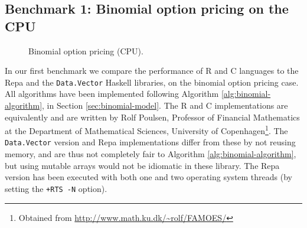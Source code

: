 \subsection{Benchmark 1: Binomial option pricing on the CPU}
\begin{figure}
	\centering
\begin{adjustbox}{minipage=1.3\textwidth,margin=0pt \smallskipamount,center}
\end{adjustbox}
\caption{Binomial option pricing (CPU).}
\label{fig:binomial-cpu}
\end{figure}

In our first benchmark we compare the performance of R and C languages
to the Repa and the \lstinline{Data.Vector} Haskell libraries, on the
binomial option pricing case. All algorithms have been implemented
following Algorithm \ref{alg:binomial-algorithm}, in Section
\ref{sec:binomial-model}. The R and C implementations are equivalently
and are written by Rolf Poulsen, Professor of Financial Mathematics at
the Department of Mathematical Sciences, University of
Copenhagen\footnote{Obtained from
  \url{http://www.math.ku.dk/~rolf/FAMOES/}}. The \lstinline{Data.Vector}
version and Repa implementations differ from these by not reusing
memory, and are thus not completely fair to Algorithm
\ref{alg:binomial-algorithm}, but using mutable arrays would not be
idiomatic in these library. The Repa version has been executed with
both one and two operating system threads (by setting the \lstinline{+RTS -N} option).

